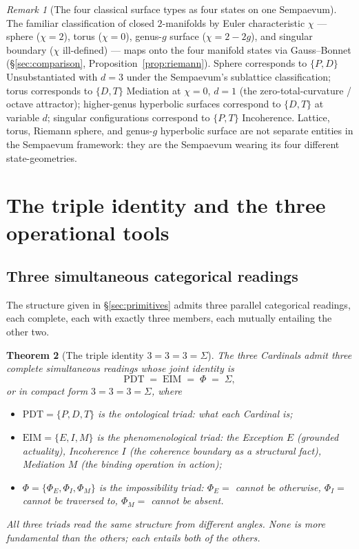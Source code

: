 \documentclass[11pt,a4paper]{article}
\newtheorem{theorem}{Theorem}[section]
\theoremstyle{definition}
\theoremstyle{remark}
\newtheorem{remark}[theorem]{Remark}
\begin{document}
\begin{remark}[The four classical surface types as four states on one Sempaevum]
The familiar classification of closed $2$-manifolds by Euler characteristic $\chi$ --- sphere ($\chi = 2$), torus ($\chi = 0$), genus-$g$ surface ($\chi = 2-2g$), and singular boundary ($\chi$ ill-defined) --- maps onto the four manifold states via Gauss--Bonnet (\S\ref{sec:comparison}, Proposition~\ref{prop:riemann}). Sphere corresponds to $\{P,D\}$ Unsubstantiated with $d=3$ under the Sempaevum's sublattice classification; torus corresponds to $\{D,T\}$ Mediation at $\chi=0$, $d=1$ (the zero-total-curvature / octave attractor); higher-genus hyperbolic surfaces correspond to $\{D,T\}$ at variable $d$; singular configurations correspond to $\{P,T\}$ Incoherence. Lattice, torus, Riemann sphere, and genus-$g$ hyperbolic surface are not separate entities in the Sempaevum framework: they are the Sempaevum wearing its four different state-geometries.
\end{remark}

\section{The triple identity and the three operational tools}\label{sec:triads}

\subsection{Three simultaneous categorical readings}

The structure given in \S\ref{sec:primitives} admits three parallel categorical readings, each complete, each with exactly three members, each mutually entailing the other two.

\begin{theorem}[The triple identity $3=3=3=\Sigma$]\label{thm:triads}
The three Cardinals admit three complete simultaneous readings whose joint identity is
\[
\boxed{\;\mathrm{PDT} \;=\; \mathrm{EIM} \;=\; \Phi \;=\; \Sigma,\;}
\]
or in compact form $3=3=3=\Sigma$, where
\begin{itemize}[leftmargin=*]
\item $\mathrm{PDT} = \{P,D,T\}$ is the \emph{ontological} triad: what each Cardinal is;
\item $\mathrm{EIM} = \{E,I,M\}$ is the \emph{phenomenological} triad: the Exception $E$ (grounded actuality), Incoherence $I$ (the coherence boundary as a structural fact), Mediation $M$ (the binding operation in action);
\item $\Phi = \{\Phi_{E},\Phi_{I},\Phi_{M}\}$ is the \emph{impossibility} triad: $\Phi_{E} = $ \textit{cannot be otherwise}, $\Phi_{I} = $ \textit{cannot be traversed to}, $\Phi_{M} = $ \textit{cannot be absent}.
\end{itemize}
All three triads read the same structure from different angles. None is more fundamental than the others; each entails both of the others.
\end{theorem}
\end{document}
